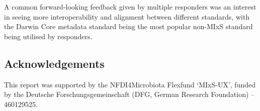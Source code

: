 \documentclass[
  letterpaper,
  DIV=11,
  numbers=noendperiod]{scrartcl}
\begin{document}
A common forward-looking feedback given by multiple responders was an
interest in seeing more interoperability and alignment between different
standards, with the Darwin Core metadata standard being the most popular
non-MIxS standard being utilised by responders.

\subsection{Acknowledgements}\label{acknowledgements}

This report was supported by the NFDI4Microbiota Flexfund `MIxS-UX',
funded by the Deutsche Forschungsgemeinschaft (DFG, German Research
Foundation) -- 460129525.
\end{document}
